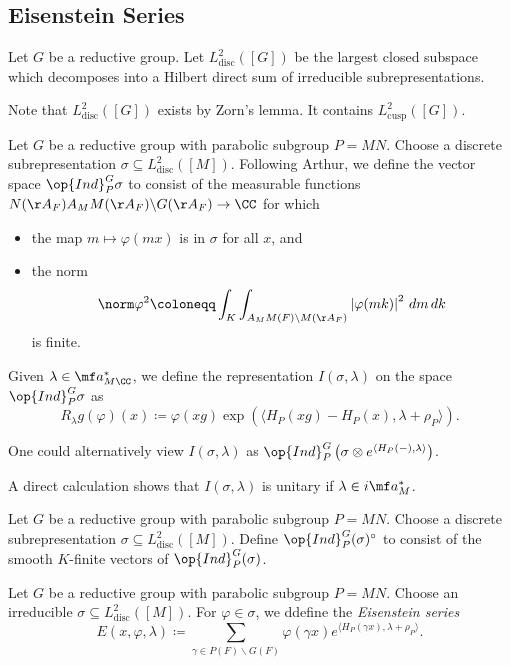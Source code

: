 \documentclass{article}
\begin{document}
\subsection{Eisenstein Series}
\begin{definition}
	Let $G$ be a reductive group. Let $L^2_{\mathrm{disc}}([G])$ be the largest closed subspace which decomposes into a Hilbert direct sum of irreducible subrepresentations.
\end{definition}
\begin{remark}
	Note that $L^2_{\mathrm{disc}}([G])$ exists by Zorn's lemma. It contains $L^2_{\mathrm{cusp}}([G])$.
\end{remark}
\begin{notation}
	Let $G$ be a reductive group with parabolic subgroup $P=MN$. Choose a discrete subrepresentation $\sigma\subseteq L^2_{\mathrm{disc}}([M])$. Following Arthur, we define the vector space $\op{Ind}_P^G\sigma$ to consist of the measurable functions $N(\AA_F)A_MM(\AA_F)\backslash G(\AA_F)\to\CC$ for which
	\begin{itemize}
		\item the map $m\mapsto\varphi(mx)$ is in $\sigma$ for all $x$, and
		\item the norm
		\[\norm\varphi^2\coloneqq\int_K\int_{A_MM(F)\backslash M(\AA_F)}\left|\varphi(mk)\right|^2\,dm\,dk\]
		is finite.
	\end{itemize}
	Given $\lambda\in\mf a^*_{M\CC}$, we define the representation $I(\sigma,\lambda)$ on the space $\op{Ind}_P^G\sigma$ as
	\[R_\lambda g(\varphi)(x)\coloneqq\varphi(xg)\exp(\langle H_P(xg)-H_P(x),\lambda+\rho_P\rangle).\]
\end{notation}
\begin{remark}
	One could alternatively view $I(\sigma,\lambda)$ as $\op{Ind}_P^G\left(\sigma\otimes e^{\langle H_P(-),\lambda\rangle}\right)$.
\end{remark}
\begin{remark}
	A direct calculation shows that $I(\sigma,\lambda)$ is unitary if $\lambda\in i\mf a_M^*$.
\end{remark}
\begin{notation}
	Let $G$ be a reductive group with parabolic subgroup $P=MN$. Choose a discrete subrepresentation $\sigma\subseteq L^2_{\mathrm{disc}}([M])$. Define $\op{Ind}_P^G(\sigma)^\circ$ to consist of the smooth $K$-finite vectors of $\op{Ind}_P^G(\sigma)$.
\end{notation}
\begin{definition}
	Let $G$ be a reductive group with parabolic subgroup $P=MN$. Choose an irreducible $\sigma\subseteq L^2_{\mathrm{disc}}([M])$. For $\varphi\in\sigma$, we ddefine the \textit{Eisenstein series}
	\[E(x,\varphi,\lambda)\coloneqq\sum_{\gamma\in P(F)\backslash G(F)}\varphi(\gamma x)e^{\langle H_P(\gamma x),\lambda+\rho_P\rangle}.\]
\end{definition}
\end{document}
